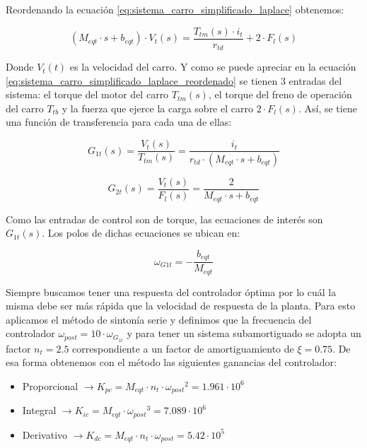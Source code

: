 \documentclass[11pt]{article}
\begin{document}
Reordenando la ecuación \ref{eq:sistema_carro_simplificado_laplace} obtenemos:

\begin{equation}
	\label{eq:sistema_carro_simplificado_laplace_reordenado}
	\left ( M_{eqt}\cdot s+b_{eqt} \right )\cdot V_{t}(s) = \frac{T_{tm}(s)\cdot i_{t}}{r_{td}}+ 2\cdot F_{l}(s)
\end{equation}

Donde $V_{t}(t)$ es la velocidad del carro. Y como se puede apreciar en la ecuación \ref{eq:sistema_carro_simplificado_laplace_reordenado} se tienen 3 entradas del sistema: el torque del motor del carro $T_{tm}(s)$, el torque del freno de operación del carro $T_{tb}$ y la fuerza que ejerce la carga sobre el carro $2\cdot F_{l}(s)$. Así, se tiene una función de transferencia para cada una de ellas:

\begin{equation}
	\label{eq:sistema_carro_simplificado_laplace_G1t}
	G_{1t}(s)=\frac{V_{t}(s)}{T_{tm}(s)}=\frac{i_{t}}{r_{td}\cdot (M_{eqt}\cdot s+b_{eqt})}
\end{equation}

\begin{equation}
	\label{eq:sistema_carro_simplificado_laplace_G2t}
	G_{2t}(s)=\frac{V_{t}(s)}{F_{l}(s)}=\frac{2}{M_{eqt}\cdot s+b_{eqt}}
\end{equation}

Como las entradas de control son de torque, las ecuaciones de interés son $G_{1t}(s)$. Los polos de dichas ecuaciones se ubican en:

\begin{equation}
	\label{eq:sistema_carro_simplificado_laplace_polos}
	\omega_{G1t}=-\frac{b_{eqt}}{M_{eqt}}
\end{equation}

Siempre buscamos tener una respuesta del controlador óptima por lo cuál la misma debe ser más rápida que la velocidad de respuesta de la planta. Para esto aplicamos el método de sintonía serie y definimos que la frecuencia del controlador $\omega_{post}=10\cdot \omega_{G_{1t}}$ y para tener un sistema  subamortiguado se adopta un factor $n_{t}=2.5$ correspondiente a un factor de amortiguamiento de $\xi =0.75$. De esa forma obtenemos con el método las siguientes ganancias del controlador:

\begin{itemize}
	\item Proporcional $\rightarrow K_{pc} = M_{eqt}\cdot n_{t}\cdot {\omega_{post}}^{2} = 1.961 \cdot 10^6$
	\item Integral $\rightarrow K_{ic} = M_{eqt}\cdot {\omega_{post}}^{3}  = 7.089 \cdot 10^6$
	\item Derivativo $\rightarrow K_{dc} = M_{eqt}\cdot n_{t}\cdot {\omega_{post}} = 5.42 \cdot 10^5$
\end{itemize}
\end{document}
